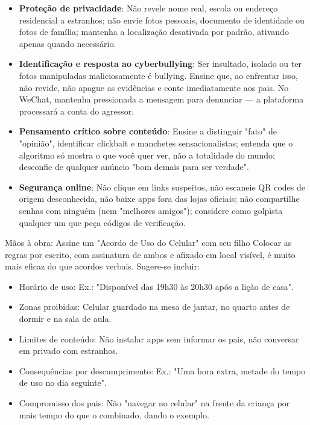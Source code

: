 \begin{itemize}
  \item \textbf{Proteção de privacidade}: Não revele nome real, escola ou endereço residencial a estranhos; não envie fotos pessoais, documento de identidade ou fotos de família; mantenha a localização desativada por padrão, ativando apenas quando necessário.
  \item \textbf{Identificação e resposta ao cyberbullying}: Ser insultado, isolado ou ter fotos manipuladas maliciosamente é bullying. Ensine que, ao enfrentar isso, não revide, não apague as evidências e conte imediatamente aos pais. No WeChat, mantenha pressionada a mensagem para denunciar — a plataforma processará a conta do agressor.
  \item \textbf{Pensamento crítico sobre conteúdo}: Ensine a distinguir "fato" de "opinião", identificar clickbait e manchetes sensacionalistas; entenda que o algoritmo só mostra o que você quer ver, não a totalidade do mundo; desconfie de qualquer anúncio "bom demais para ser verdade".
  \item \textbf{Segurança online}: Não clique em links suspeitos, não escaneie QR codes de origem desconhecida, não baixe apps fora das lojas oficiais; não compartilhe senhas com ninguém (nem "melhores amigos"); considere como golpista qualquer um que peça códigos de verificação.
\end{itemize}

\begin{tcbpractice}{Mãos à obra: Assine um "Acordo de Uso do Celular" com seu filho}
Colocar as regras por escrito, com assinatura de ambos e afixado em local visível, é muito mais eficaz do que acordos verbais. Sugere-se incluir:

\begin{itemize}
  \item Horário de uso: Ex.: "Disponível das 19h30 às 20h30 após a lição de casa".
  \item Zonas proibidas: Celular guardado na mesa de jantar, no quarto antes de dormir e na sala de aula.
  \item Limites de conteúdo: Não instalar apps sem informar os pais, não conversar em privado com estranhos.
  \item Consequências por descumprimento: Ex.: "Uma hora extra, metade do tempo de uso no dia seguinte".
  \item Compromisso dos pais: Não "navegar no celular" na frente da criança por mais tempo do que o combinado, dando o exemplo.
\end{itemize}

\end{tcbpractice}

